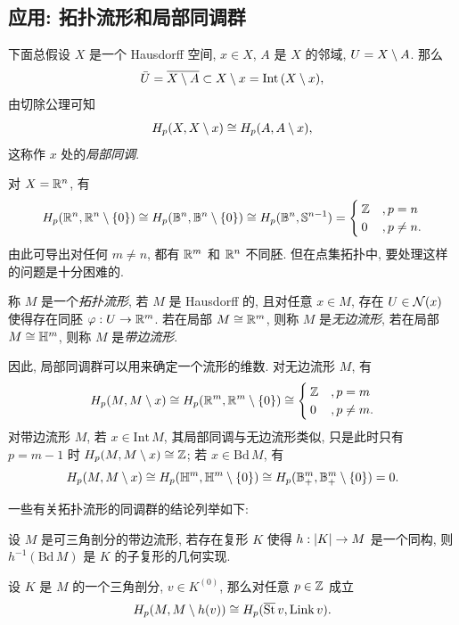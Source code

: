 \subsection{应用: 拓扑流形和局部同调群}

下面总假设 $ X $ 是一个 Hausdorff 空间, $ x\in X $, $ A $ 是 $ X $ 的邻域, $ U=X\setminus A $. 那么
\[
	\bar{U}=\overline{X\setminus A}\subset X\setminus x=\mathrm{Int}\,(X\setminus x),
\]
由切除公理可知
\[
	H_p(X,X\setminus x)\cong H_p(A,A\setminus x),
\]
这称作 $ x $ 处的\emph{局部同调}.

\begin{Example}
	对 $ X=\mathbb{R}^n $, 有
	\[
		H_p(\mathbb{R}^n,\mathbb{R}^n\setminus\left\{ 0 \right\})\cong H_p(\mathbb{B}^n,\mathbb{B}^n\setminus\left\{ 0 \right\})\cong H_p(\mathbb{B}^n,\mathbb{S}^{n-1})=\begin{cases}
			\mathbb{Z} &,p=n \\ 0 &,p\ne n.
		\end{cases}
	\]
	由此可导出对任何 $ m\ne n $, 都有 $ \mathbb{R}^m $ 和 $ \mathbb{R}^n $ 不同胚. 但在点集拓扑中, 要处理这样的问题是十分困难的.
\end{Example}

\begin{Definition}[拓扑流形]
	称 $ M $ 是一个\emph{拓扑流形}, 若 $ M $ 是 Hausdorff 的, 且对任意 $ x\in M $, 存在 $ U\in\mathcal{N}(x) $ 使得存在同胚 $ \varphi : U\to\mathbb{R}^m $. 若在局部 $ M\cong\mathbb{R}^m $, 则称 $ M $ 是\emph{无边流形}, 若在局部 $ M\cong\mathbb{H}^m $, 则称 $ M $ 是\emph{带边流形}.
\end{Definition}

因此, 局部同调群可以用来确定一个流形的维数. 对无边流形 $ M $, 有
\[
	H_p(M,M\setminus x)\cong H_p(\mathbb{R}^m,\mathbb{R}^m\setminus \left\{ 0 \right\})\cong\begin{cases}
		\mathbb{Z} &,p=m \\ 0 &,p\ne m.
	\end{cases}
\]
对带边流形 $ M $, 若 $ x\in\mathrm{Int}\,M $, 其局部同调与无边流形类似, 只是此时只有 $ p=m-1 $ 时 $ H_p(M,M\setminus x)\cong\mathbb{Z} $; 若 $ x\in\mathrm{Bd}\,M $, 有
\[
	H_p(M,M\setminus x)\cong H_p(\mathbb{H}^m,\mathbb{H}^m\setminus\left\{ 0 \right\})\cong H_p(\mathbb{B}^m_+,\mathbb{B}^m_+\setminus\left\{ 0 \right\})=0.
\]

一些有关拓扑流形的同调群的结论列举如下:

\begin{Theorem}
	设 $ M $ 是可三角剖分的带边流形, 若存在复形 $ K $ 使得 $ h : \left| K \right| \to M $ 是一个同构, 则 $ h^{-1}(\mathrm{Bd}\,M) $ 是 $ K $ 的子复形的几何实现.
\end{Theorem}

\begin{Theorem}
	设 $ K $ 是 $ M $ 的一个三角剖分, $ v\in K^{(0)} $, 那么对任意 $ p\in\mathbb{Z} $ 成立
	\[
		H_p(M,M\setminus h(v))\cong H_p(\overline{\mathrm{St}}\,v,\mathrm{Link}\,v).
	\]
\end{Theorem}